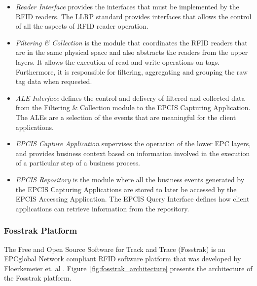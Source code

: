 \begin{itemize}
  \item \textit{Reader Interface} provides the interfaces that must be implemented by the \gls{RFID} readers.
  The \gls{LLRP} standard provides interfaces that allows the control of all the aspects of \gls{RFID}
  reader operation.
  \item \textit{Filtering \& Collection} is the module that coordinates the \gls{RFID} readers that are in the
  same physical space and also abstracts the readers from the upper layers. It allows the execution of
  read and write operations on tags. Furthermore, it is responsible for filtering, aggregating and
  grouping the raw tag data when requested.
  \item \textit{\gls{ALE} Interface} defines the control and delivery of filtered and collected data from the
  Filtering \&  Collection module to the \gls{EPCIS} Capturing Application. The \glspl{ALE} are a selection of
  the events that are meaningful for the client applications.
  \item \textit{EPCIS Capture Application} supervises the operation of the lower EPC layers, and provides
  business context based on information involved in the execution of a particular step of a business
  process.
  \item \textit{EPCIS Repository} is the module where all the business events generated by the
  EPCIS Capturing Applications are stored to later be accessed by the EPCIS Accessing Application.
  The EPCIS Query Interface defines how client applications can retrieve information from the repository.
\end{itemize}

\subsubsection{Fosstrak Platform}
\label{subs:fosstrak}
The Free and Open Source Software for Track and Trace (Fosstrak) is an EPCglobal Network compliant
\gls{RFID} software platform that was developed by Floerkemeier et. al \cite{floerkemeier2007rfid}.
Figure~\ref{fig:fosstrak_architecture} presents the architecture of the Fosstrak platform.\\


